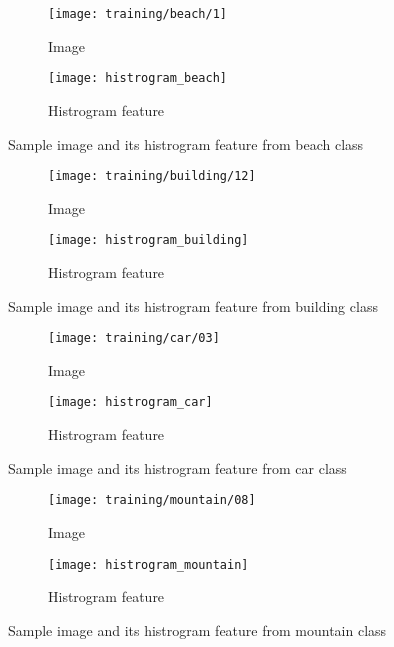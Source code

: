 \documentclass[11pt]{article}
\begin{document}
\begin{figure}[H]
\begin{subfigure}{1\textwidth}
  \centering
  \texttt{[image: training/beach/1]}
  \caption{Image}
  \label{}
\end{subfigure}
\begin{subfigure}{1\textwidth}
  \centering
  \texttt{[image: histrogram\_beach]}
  \caption{Histrogram feature}
  \label{}
\end{subfigure}

\caption{Sample image and its histrogram feature from beach class}
\label{}
\end{figure}

\begin{figure}[H]
\begin{subfigure}{1\textwidth}
  \centering
  \texttt{[image: training/building/12]}
  \caption{Image}
  \label{}
\end{subfigure}
\begin{subfigure}{1\textwidth}
  \centering
  \texttt{[image: histrogram\_building]}
  \caption{Histrogram feature}
  \label{}
\end{subfigure}

\caption{Sample image and its histrogram feature from building class}
\label{}
\end{figure}

\begin{figure}[H]
\begin{subfigure}{1\textwidth}
  \centering
  \texttt{[image: training/car/03]}
  \caption{Image}
  \label{}
\end{subfigure}
\begin{subfigure}{1\textwidth}
  \centering
  \texttt{[image: histrogram\_car]}
  \caption{Histrogram feature}
  \label{}
\end{subfigure}

\caption{Sample image and its histrogram feature from car class}
\label{}
\end{figure}

\begin{figure}[H]
\begin{subfigure}{1\textwidth}
  \centering
  \texttt{[image: training/mountain/08]}
  \caption{Image}
  \label{}
\end{subfigure}
\begin{subfigure}{1\textwidth}
  \centering
  \texttt{[image: histrogram\_mountain]}
  \caption{Histrogram feature}
  \label{}
\end{subfigure}

\caption{Sample image and its histrogram feature from mountain class}
\label{}
\end{figure}
\end{document}
